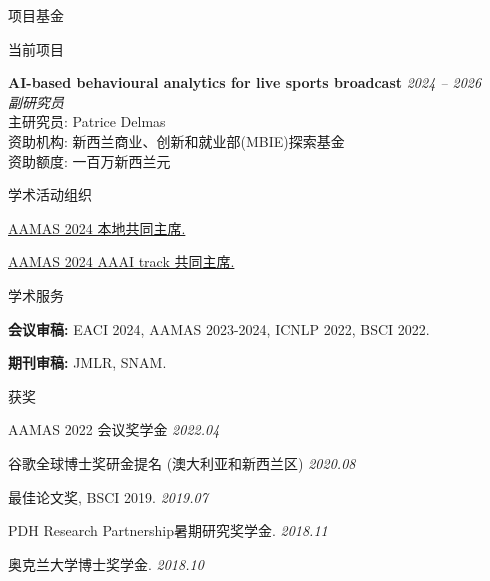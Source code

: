 \documentclass{resume} %
\begin{document}
\begin{rSection}{项目基金}
	\begin{rSubsection}{当前项目}{}{}{}
		\item {\bf AI-based behavioural analytics for live sports broadcast} \hfill {\em 2024 -- 2026}\\
			{\em 副研究员}\\
			主研究员: Patrice Delmas\\
			资助机构: 新西兰商业、创新和就业部(MBIE)探索基金\\
			资助额度: 一百万新西兰元
	\end{rSubsection}
\end{rSection}



\begin{rSection}{学术活动组织}
	\begin{rSubsection}{}{}{}{}
		\item \href{https://www.aamas2024-conference.auckland.ac.nz/organization/organizing-committee/}{AAMAS 2024 本地共同主席.}
		\item \href{https://www.aamas2024-conference.auckland.ac.nz/organization/organizing-committee/}{AAMAS 2024 AAAI track 共同主席.}
	\end{rSubsection}
\end{rSection}

\begin{rSection}{学术服务}
	\begin{rSubsection}{}{}{}{}
		\item {\bf 会议审稿:} EACI 2024, AAMAS 2023-2024, ICNLP 2022, BSCI 2022.
		\item {\bf 期刊审稿:} JMLR, SNAM.
	\end{rSubsection}
\end{rSection}


\begin{rSection}{获奖}
\begin{rSubsection}{}{}{}{}
\item AAMAS 2022 会议奖学金 \hfill {\em 2022.04}
\item 谷歌全球博士奖研金提名 (澳大利亚和新西兰区) \hfill {\em 2020.08}
\item 最佳论文奖, BSCI 2019. \hfill {\em 2019.07}
\item PDH Research Partnership暑期研究奖学金. \hfill {\em 2018.11}
\item 奥克兰大学博士奖学金. \hfill {\em 2018.10}
\end{rSubsection}
\end{rSection}
\end{document}
